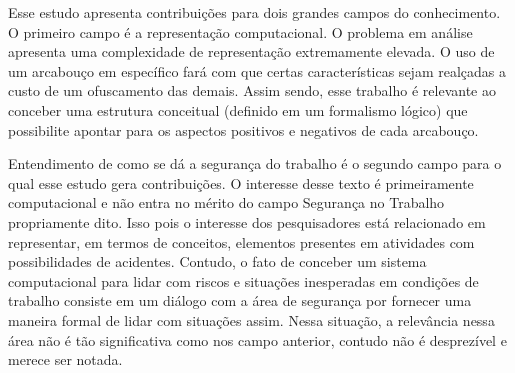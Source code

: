 Esse estudo apresenta contribuições para dois grandes campos do conhecimento. O primeiro campo é a representação computacional. O problema em análise apresenta uma complexidade de representação extremamente elevada. O uso de um arcabouço em específico fará com que certas características sejam realçadas a custo de um ofuscamento das demais. Assim sendo, esse trabalho é relevante ao conceber uma estrutura conceitual (definido em um formalismo lógico) que possibilite apontar para os aspectos positivos e negativos de cada arcabouço. 

Entendimento de como se dá a segurança do trabalho é o segundo campo para o qual esse estudo gera contribuições. O interesse desse texto é primeiramente computacional e não entra no mérito do campo Segurança no Trabalho propriamente dito. Isso pois o interesse dos pesquisadores está relacionado em representar, em termos de conceitos, elementos presentes em atividades com possibilidades de acidentes. Contudo, o fato de conceber um sistema computacional para lidar com riscos e situações inesperadas em condições de trabalho consiste em um diálogo com a área de segurança por fornecer uma maneira formal de lidar com situações assim. Nessa situação, a relevância nessa área não é tão significativa como nos campo anterior, contudo não é desprezível e merece ser notada.
